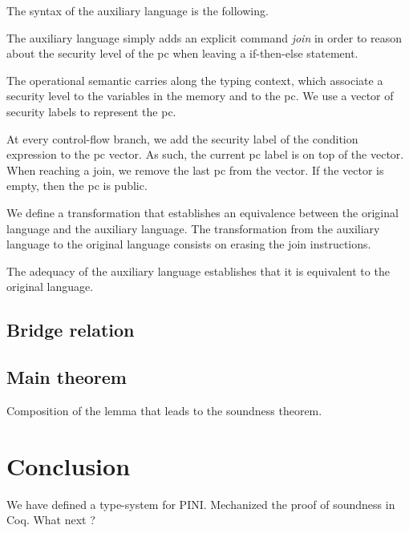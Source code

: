\documentclass[10pt]{article}
\begin{document}
The syntax of the auxiliary language is the following.

The auxiliary language simply adds an explicit command \emph{join} in order to reason about the
security level of the pc when leaving a if-then-else statement.

The operational semantic carries along the typing context, which associate a security level to the
variables in the memory and to the pc.
We use a vector of security labels to represent the pc.


At every control-flow branch, we add the security label of the condition expression to the pc
vector. As such, the current pc label is on top of the vector. When reaching a join, we remove the
last pc from the vector. If the vector is empty, then the pc is public.


We define a transformation that establishes an equivalence between the original language and the
auxiliary language.
The transformation from the auxiliary language to the original language consists on erasing the join
instructions.

The adequacy of the auxiliary language establishes that it is equivalent to the original language.

\subsection{Bridge relation}%
\label{subsec:brigde_rel}

\subsection{Main theorem}%
\label{subsec:main_theorem}

Composition of the lemma that leads to the soundness theorem.

\section{Conclusion}%
\label{sec:conclusion}

We have defined a type-system for PINI. Mechanized the proof of soundness in Coq.
What next ?




\end{document}
